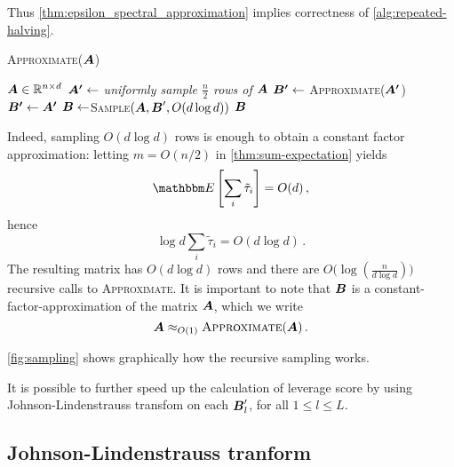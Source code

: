 

Thus \autoref{thm:epsilon_spectral_approximation} implies correctness of
\autoref{alg:repeated-halving}.


\begin{algorithm}[H]
    \caption{\textsc{Approximate}($\boldsymbol A$)}
    \label{alg:repeated-halving}
    \begin{algorithmic}[1]
        \Ensure $\boldsymbol A \in \mathbb R ^{n \times d}$
        \State \textit{$\boldsymbol{A'} \leftarrow$ uniformly sample $\frac{n}{2}$ rows of $\boldsymbol A$}
            \State $\boldsymbol{B'} \leftarrow$ \textsc{Approximate}($\boldsymbol{A'}$)
        \Else
            \State $\boldsymbol{B'} \leftarrow \boldsymbol {A'}$
        \EndIf
        \State $\boldsymbol{B} \leftarrow $\textsc{Sample}$(\boldsymbol A, \boldsymbol B', O(d \log d))$
        \State \Return $\boldsymbol{B}$
    \end{algorithmic}
\end{algorithm}
Indeed, sampling $O(d \log d)$ rows is enough to obtain a constant factor
approximation: letting $m = O(n/2)$ in \autoref{thm:sum-expectation} yields
\begin{equation*}
\mathbbm E \left[ {\sum_i \tilde \tau_i} \right] = O(d) \, ,
\end{equation*}
hence
\begin{equation*}
    \log d \sum_i \tilde \tau_i = O(d \log d) \, .
\end{equation*}
The resulting matrix has $O(d\log d)$ rows and there are $O\big(\log
(\frac{n}{d\log d})\big)$ recursive calls to \textsc{Approximate}. It is
important to note that $\boldsymbol B$ is a
constant-factor-approximation of the matrix $\boldsymbol A$, which we write
$$\boldsymbol A \approx_{O(1)} \textsc{Approximate}(\boldsymbol A) \, .$$

\autoref{fig:sampling} shows graphically how the recursive sampling works.

It is possible to further speed up the calculation of leverage score by using
Johnson-Lindenstrauss transfom on each $\boldsymbol B_l'$, for all $1 \leq l \leq L$.

\subsection{Johnson-Lindenstrauss tranform}

